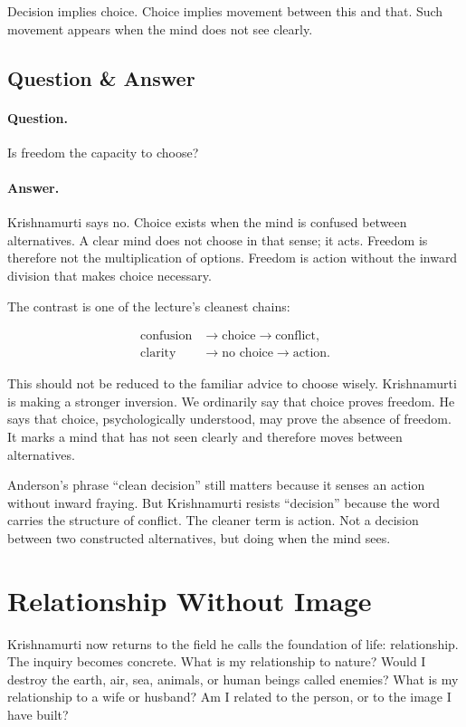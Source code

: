 Decision implies choice. Choice implies movement between this and that. Such movement appears when the mind does not see clearly.

\subsection{Question \& Answer}

\paragraph{Question.}
Is freedom the capacity to choose?

\paragraph{Answer.}
Krishnamurti says no. Choice exists when the mind is confused between alternatives. A clear mind does not choose in that sense; it acts. Freedom is therefore not the multiplication of options. Freedom is action without the inward division that makes choice necessary.

The contrast is one of the lecture's cleanest chains:

\begin{align}
\text{confusion}
&\longrightarrow \text{choice}
\longrightarrow \text{conflict}, \\
\text{clarity}
&\longrightarrow \text{no choice}
\longrightarrow \text{action}.
\end{align}

This should not be reduced to the familiar advice to choose wisely. Krishnamurti is making a stronger inversion. We ordinarily say that choice proves freedom. He says that choice, psychologically understood, may prove the absence of freedom. It marks a mind that has not seen clearly and therefore moves between alternatives.

Anderson's phrase ``clean decision'' still matters because it senses an action without inward fraying. But Krishnamurti resists ``decision'' because the word carries the structure of conflict. The cleaner term is action. Not a decision between two constructed alternatives, but doing when the mind sees.

\section{Relationship Without Image}

Krishnamurti now returns to the field he calls the foundation of life: relationship. The inquiry becomes concrete. What is my relationship to nature? Would I destroy the earth, air, sea, animals, or human beings called enemies? What is my relationship to a wife or husband? Am I related to the person, or to the image I have built?

